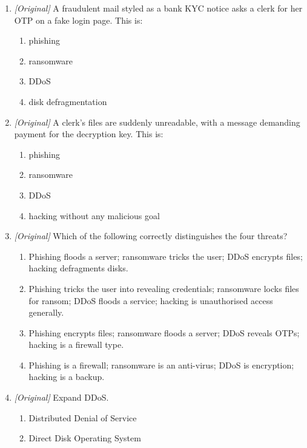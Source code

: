 \documentclass[11pt]{article}
\begin{document}
\begin{enumerate}[label=\textbf{Q\arabic*.}, leftmargin=*]
\begin{enumerate}[label=\Alph*.]
    \item Stateful-inspection firewall
    \item Application (proxy) firewall
    \item Spam filter of the mail client only
  \end{enumerate}
\item \textit{[Original]} A fraudulent mail styled as a bank KYC notice asks a clerk for her OTP on a fake login page. This is:
  \begin{enumerate}[label=\Alph*.]
    \item phishing
    \item ransomware
    \item DDoS
    \item disk defragmentation
  \end{enumerate}
\item \textit{[Original]} A clerk's files are suddenly unreadable, with a message demanding payment for the decryption key. This is:
  \begin{enumerate}[label=\Alph*.]
    \item phishing
    \item ransomware
    \item DDoS
    \item hacking without any malicious goal
  \end{enumerate}
\item \textit{[Original]} Which of the following correctly distinguishes the four threats?
  \begin{enumerate}[label=\Alph*.]
    \item Phishing floods a server; ransomware tricks the user; DDoS encrypts files; hacking defragments disks.
    \item Phishing tricks the user into revealing credentials; ransomware locks files for ransom; DDoS floods a service; hacking is unauthorised access generally.
    \item Phishing encrypts files; ransomware floods a server; DDoS reveals OTPs; hacking is a firewall type.
    \item Phishing is a firewall; ransomware is an anti-virus; DDoS is encryption; hacking is a backup.
  \end{enumerate}
\item \textit{[Original]} Expand DDoS.
  \begin{enumerate}[label=\Alph*.]
    \item Distributed Denial of Service
    \item Direct Disk Operating System

\end{enumerate}
\end{enumerate}
\end{document}
